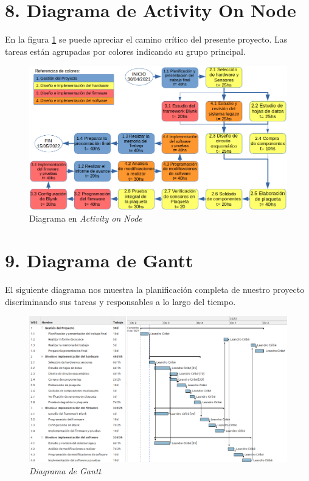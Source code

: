 \documentclass[
11pt, %
]{charter}
\begin{document}
\section{8. Diagrama de Activity On Node}
\label{sec:AoN}
En la figura \ref{fig:AoN} se puede apreciar el camino crítico del presente proyecto. Las tareas están agrupadas por colores indicando su grupo principal.
\begin{figure}[htpb]
\centering 
\includegraphics[width=.9\textwidth]{./Figuras/AoN.png}
\caption{Diagrama en \textit{Activity on Node}}
\label{fig:AoN}
\end{figure}

\section{9. Diagrama de Gantt}
\label{sec:gantt}

El siguiente diagrama nos muestra la planificación completa de nuestro proyecto discriminando sus tareas y responsables a lo largo del tiempo.

\begin{figure}[htpb]
\centering 
\includegraphics[width=.9\textwidth]{./Figuras/gantt.png}
\caption{\textit{Diagrama de Gantt}}
\label{fig:gantt}
\end{figure}
\end{document}
